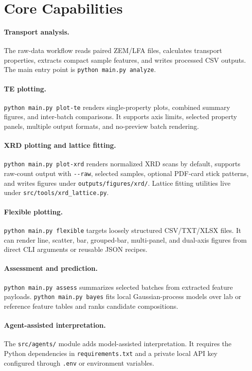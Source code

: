 \documentclass[10pt,twocolumn]{article}
\newcommand{\code}[1]{\nolinkurl{#1}}
\begin{document}
\section{Core Capabilities}

\paragraph{Transport analysis.}
The raw-data workflow reads paired ZEM/LFA files, calculates transport
properties, extracts compact sample features, and writes processed CSV outputs.
The main entry point is \code{python main.py analyze}.

\paragraph{TE plotting.}
\code{python main.py plot-te} renders single-property plots, combined summary figures, and
inter-batch comparisons. It supports axis limits, selected property panels,
multiple output formats, and no-preview batch rendering.

\paragraph{XRD plotting and lattice fitting.}
\code{python main.py plot-xrd} renders normalized XRD scans by default, supports
raw-count output with \code{--raw}, selected samples, optional PDF-card stick
patterns, and writes figures under
\code{outputs/figures/xrd/}. Lattice fitting utilities live under
\code{src/tools/xrd_lattice.py}.

\paragraph{Flexible plotting.}
\code{python main.py flexible} targets loosely structured CSV/TXT/XLSX files. It can
render line, scatter, bar, grouped-bar, multi-panel, and dual-axis figures from
direct CLI arguments or reusable JSON recipes.

\paragraph{Assessment and prediction.}
\code{python main.py assess} summarizes selected batches from extracted
feature payloads. \code{python main.py bayes} fits local Gaussian-process
models over lab or reference feature tables and ranks candidate compositions.

\paragraph{Agent-assisted interpretation.}
The \code{src/agents/} module adds model-assisted interpretation. It requires
the Python dependencies in \code{requirements.txt} and a private local API key
configured through \code{.env} or environment variables.
\end{document}
